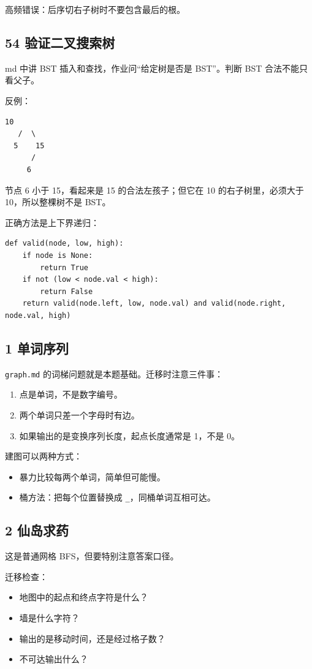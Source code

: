 \documentclass[10pt,a4paper,fontset=none]{ctexart}
\begin{document}
高频错误：后序切右子树时不要包含最后的根。

\subsection{54 验证二叉搜索树}
md 中讲 BST 插入和查找，作业问“给定树是否是 BST”。判断 BST 合法不能只看父子。

反例：
\begin{lstlisting}[style=plain]
    10
   /  \
  5    15
      /
     6
\end{lstlisting}
节点 6 小于 15，看起来是 15 的合法左孩子；但它在 10 的右子树里，必须大于 10，所以整棵树不是 BST。

正确方法是上下界递归：
\begin{lstlisting}[style=py]
def valid(node, low, high):
    if node is None:
        return True
    if not (low < node.val < high):
        return False
    return valid(node.left, low, node.val) and valid(node.right, node.val, high)
\end{lstlisting}

\subsection{1 单词序列}
\texttt{graph.md} 的词梯问题就是本题基础。迁移时注意三件事：
\begin{enumerate}
  \item 点是单词，不是数字编号。
  \item 两个单词只差一个字母时有边。
  \item 如果输出的是变换序列长度，起点长度通常是 1，不是 0。
\end{enumerate}

建图可以两种方式：
\begin{itemize}
  \item 暴力比较每两个单词，简单但可能慢。
  \item 桶方法：把每个位置替换成 \texttt{\_}，同桶单词互相可达。
\end{itemize}

\subsection{2 仙岛求药}
这是普通网格 BFS，但要特别注意答案口径。

迁移检查：
\begin{itemize}
  \item 地图中的起点和终点字符是什么？
  \item 墙是什么字符？
  \item 输出的是移动时间，还是经过格子数？
  \item 不可达输出什么？
\end{itemize}
\end{document}
